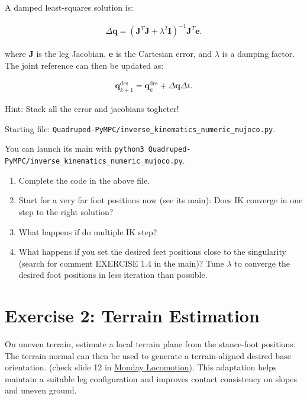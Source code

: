 \documentclass[11pt,a4paper]{article}
\begin{document}
A damped least-squares solution is:

\begin{align*}
\Delta \bm{q}
=
\left(
\bm{J}^{T}\bm{J}
+
\lambda^2\bm{I}
\right)^{-1}
\bm{J}^{T}
\bm{e}.
\end{align*}

where \(\bm{J}\) is the leg Jacobian, \(\bm{e}\) is the Cartesian error, and \(\lambda\) is a damping factor. The joint reference can then be updated as:


\begin{align*}
\bm{q}_{k+1}^{\mathrm{des}}
=
\bm{q}_k^{\mathrm{des}}
+
\Delta \bm{q} \Delta t.
\end{align*}


Hint: Stack all the error and jacobians togheter! 


Starting file: \verb|Quadruped-PyMPC/inverse_kinematics_numeric_mujoco.py|. 

You can launch its main with  \verb|python3 Quadruped-PyMPC/inverse_kinematics_numeric_mujoco.py|. 


\begin{enumerate}[label=\arabic*.]
	\item Complete the code in the above file.
	\item Start for a very far foot positions now (see its main): Does IK converge in one step to the right solution?
	\item What happens if do multiple IK step?
	\item What happens if you set the desired feet positions close to the singularity (search for comment EXERCISE 1.4 in the main)? Tune \(\lambda\) to converge the desired foot positions in less iteration than possible.
\end{enumerate}

\section*{Exercise 2: Terrain Estimation}

On uneven terrain, estimate a local terrain plane from the stance-foot positions. The terrain normal can then be used to generate a terrain-aligned desired base orientation. (check slide 12 in \href{https://github.com/idra-lab/where_summer_school/blob/main/slides/monday/A4_lomotion.pdf}{Monday Locomotion}).
This adaptation helps maintain a suitable leg configuration and improves contact consistency on slopes and uneven ground.
\end{document}
